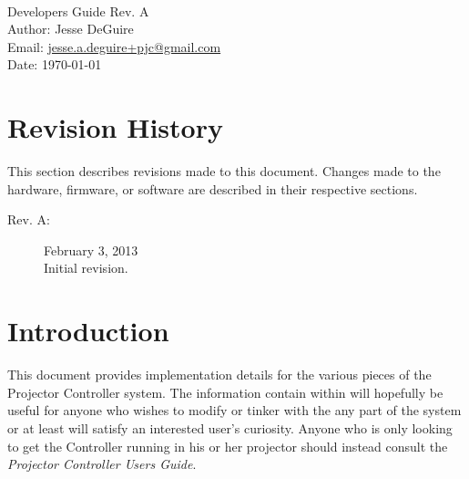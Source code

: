\documentclass{article}
\newcommand{\docrev}{A}
\begin{document}
\frenchspacing

 \\
{\large Developers Guide} Rev. \docrev \\
Author: Jesse DeGuire \\
Email: \href{mailto:jesse.a.deguire+pjc@gmail.com}{jesse.a.deguire+pjc@gmail.com} \\
Date: \today \\

\tableofcontents

\let\stdsection\section
\renewcommand{\section}{\newpage\stdsection}

\addtolength{\parskip}{6pt}

\section*{Revision History}
This section describes revisions made to this document.  Changes made to the hardware, firmware, or
software are described in their respective sections.

\begin {description}
  \item[Rev. A:] February 3, 2013\\
    Initial revision.
\end {description}

\section{Introduction}
This document provides implementation details for the various pieces of the Projector Controller
system.  The information contain within will hopefully be useful for anyone who wishes to modify or
tinker with the any part of the system or at least will satisfy an interested user's curiosity.
Anyone who is only looking to get the Controller running in his or her projector should instead
consult the \textit{Projector Controller Users Guide}.
\end{document}
